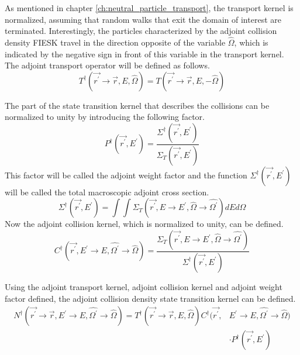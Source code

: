 As mentioned in chapter \ref{ch:neutral_particle_transport}, the transport 
kernel is normalized, assuming that random walks that exit the domain of 
interest are terminated. Interestingly, the particles characterized by the 
adjoint collision density FIESK travel in the direction opposite of the 
variable $\hat{\Omega}$, which is indicated by the negative sign in front of
this variable in the transport kernel. The adjoint transport operator will be
defined as follows.
\begin{equation}
  T^{\dagger}(\vec{r^{'}} \to \vec{r},E,\hat{\Omega}) = 
  T(\vec{r^{'}} \to \vec{r},E,-\hat{\Omega})
  \label{eq:adjoint_transport_kernel}
\end{equation}

The part of the state transition kernel that describes the 
collisions can be normalized to unity by introducing the following factor.
\begin{equation}
  P^{\dagger}(\vec{r^{'}},E^{'}) = 
  \frac{\Sigma^{\dagger}(\vec{r^{'}},E^{'})}{\Sigma_T(\vec{r^{'}},E^{'})}
  \label{eq:adjoint_weight_factor}
\end{equation}
This factor will be called the adjoint weight factor and the function 
$\Sigma^{\dagger}(\vec{r^{'}},E^{'})$ will be called the total macroscopic adjoint 
cross section.
\begin{equation}
  \Sigma^{\dagger}(\vec{r^{'}},E^{'}) = \int\int  
  \Sigma_T(\vec{r^{'}},E \to E^{'},\hat{\Omega} \to \hat{\Omega^{'}}) dE d\Omega
  \label{eq:adjoint_total_cross_section}
\end{equation}
Now the adjoint collision kernel, which is normalized to unity, can be 
defined.
\begin{equation}
  C^{\dagger}(\vec{r^{'}},E^{'} \to E,\hat{\Omega^{'}} \to \hat{\Omega}) = 
  \frac{\Sigma_T(\vec{r^{'}},E \to E^{'},\hat{\Omega} \to \hat{\Omega^{'}})}
       {\Sigma^{\dagger}(\vec{r^{'}},E^{'})}
  \label{eq:adjoint_collision_kernel}
\end{equation}

Using the adjoint transport kernel, adjoint collision kernel and adjoint
weight factor defined, the adjoint collision density state transition kernel
can be defined.
\begin{equation}
  \begin{split}
    N^{\dagger}(\vec{r^{'}} \to \vec{r},E^{'} \to E,\hat{\Omega^{'}} \to \hat{\Omega})
    = T^{\dagger}(\vec{r^{'}} \to \vec{r},E,\hat{\Omega})
    C^{\dagger}(\vec{r^{'}},&E^{'} \to E,\hat{\Omega^{'}} \to \hat{\Omega}) \\
    & \cdot P^{\dagger}(\vec{r^{'}},E^{'})
  \end{split}
\end{equation}


